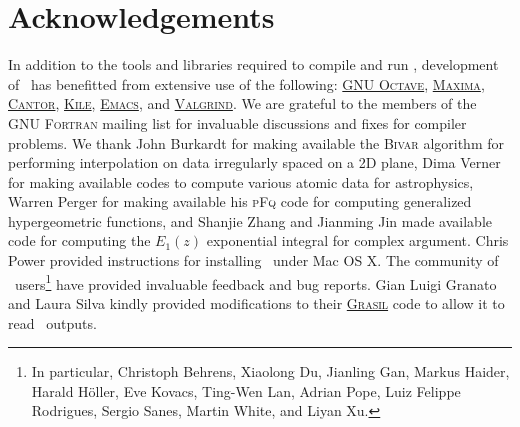 \chapter{Acknowledgements}

In addition to the tools and libraries required to compile and run \glc, development of \glc\ has benefitted from extensive use of the following: \href{http://www.gnu.org/software/octave/}{{\normalfont \scshape GNU Octave}}, \href{http://maxima.sourceforge.net/}{{\normalfont \scshape Maxima}}, \href{http://edu.kde.org/cantor/}{{\normalfont \scshape Cantor}}, \href{http://kile.sourceforge.net/}{{\normalfont \scshape Kile}}, \href{http://www.gnu.org/software/emacs/}{{\normalfont \scshape Emacs}}, and \href{http://valgrind.org/}{{\normalfont \scshape Valgrind}}. We are grateful to the members of the {\normalfont \scshape GNU Fortran} mailing list for invaluable discussions and fixes for compiler problems. We thank John Burkardt for making available the {\normalfont \scshape Bivar} algorithm for performing interpolation on data irregularly spaced on a 2D plane, Dima Verner for making available codes to compute various atomic data for astrophysics, Warren Perger for making available his {\normalfont \scshape pFq} code for computing generalized hypergeometric functions, and Shanjie Zhang and Jianming Jin made available code for computing the $E_1(z)$ exponential integral for complex argument. Chris Power provided instructions for installing \glc\ under Mac OS X. The community of \glc\ users\footnote{In particular, Christoph Behrens, Xiaolong Du, Jianling Gan, Markus Haider, Harald H\"oller, Eve Kovacs, Ting-Wen Lan, Adrian Pope, Luiz Felippe Rodrigues, Sergio Sanes, Martin White, and Liyan Xu.} have provided invaluable feedback and bug reports. Gian Luigi Granato and Laura Silva kindly provided modifications to their \href{http://adlibitum.oats.inaf.it/silva/grasil/syntax.html}{\normalfont \scshape Grasil} code to allow it to read \glc\ outputs.
